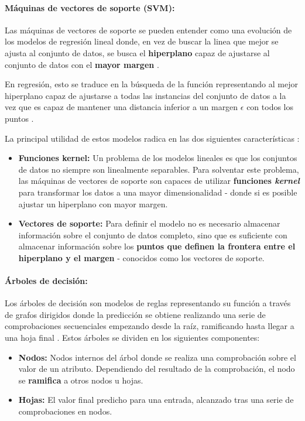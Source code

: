 \paragraph{Máquinas de vectores de soporte (SVM):} Las máquinas de vectores de soporte se pueden entender como una evolución de los modelos de regresión lineal donde, en vez de buscar la linea que mejor se ajusta al conjunto de datos, se busca el \textbf{hiperplano} capaz de ajustarse al conjunto de datos con el \textbf{mayor margen} \cite{aima}. 

En regresión, esto se traduce en la búsqueda de la función representando al mejor hiperplano capaz de ajustarse a todas las instancias del conjunto de datos a la vez que es capaz de mantener una distancia inferior a un margen $\epsilon$ con todos los puntos \cite{svr}.

La principal utilidad de estos modelos radica en las dos siguientes características \cite{aima}:
\begin{itemize}
	\item \textbf{Funciones kernel:} Un problema de los modelos lineales es que los conjuntos de datos no siempre son linealmente separables. Para solventar este problema, las máquinas de vectores de soporte son capaces de utilizar \textbf{funciones \textit{kernel}} para transformar los datos a una mayor dimensionalidad - donde si es posible ajustar un hiperplano con mayor margen.
	\item \textbf{Vectores de soporte:} Para definir el modelo no es necesario almacenar información sobre el conjunto de datos completo, sino que es suficiente con almacenar información sobre los \textbf{puntos que definen la frontera entre el hiperplano y el margen} - conocidos como los vectores de soporte.
\end{itemize}

\paragraph{Árboles de decisión:} Los árboles de decisión son modelos de reglas representando su función a través de grafos dirigidos \cite{Burkov2019TheHM} donde la predicción se obtiene realizando una serie de comprobaciones secuenciales empezando desde la raíz, ramificando hasta llegar a una hoja final \cite{aima}. Estos árboles se dividen en los siguientes componentes:

\begin{itemize}
	\item \textbf{Nodos:} Nodos internos del árbol donde se realiza una comprobación sobre el valor de un atributo. Dependiendo del resultado de la comprobación, el nodo se \textbf{ramifica} a otros nodos u hojas.
	\item \textbf{Hojas:} El valor final predicho para una entrada, alcanzado tras una serie de comprobaciones en nodos.
\end{itemize}

